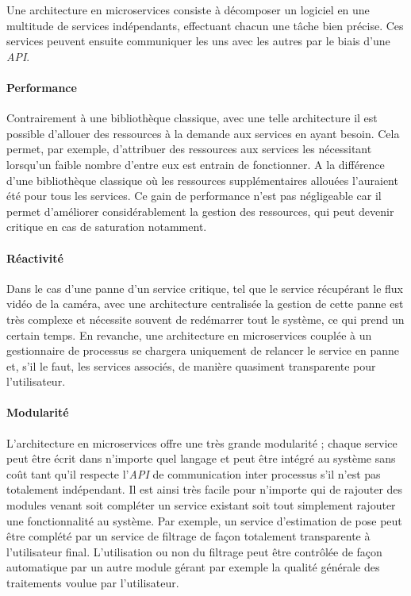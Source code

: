 Une architecture en microservices consiste à décomposer un logiciel en une multitude de services indépendants, effectuant chacun une tâche bien précise. Ces services peuvent ensuite communiquer les uns avec les autres par le biais d'une \emph{API}.

\paragraph{Performance} Contrairement à une bibliothèque classique, avec une telle architecture il est possible d'allouer des ressources à la demande aux services en ayant besoin. Cela permet, par exemple, d'attribuer des ressources aux services les nécessitant lorsqu'un faible nombre d'entre eux est entrain de fonctionner. A la différence d'une bibliothèque classique où les ressources supplémentaires allouées l'auraient été pour tous les services. Ce gain de performance n'est pas négligeable car il permet d'améliorer considérablement la gestion des ressources, qui peut devenir critique en cas de saturation notamment.

\paragraph{Réactivité} Dans le cas d'une panne d'un service critique, tel que le service récupérant le flux vidéo de la caméra, avec une architecture centralisée la gestion de cette panne est très complexe et nécessite souvent de redémarrer tout le système, ce qui prend un certain temps. En revanche, une architecture en microservices couplée à un gestionnaire de processus se chargera uniquement de relancer le service en panne et, s'il le faut, les services associés, de manière quasiment transparente pour l'utilisateur.

\paragraph{Modularité} L'architecture en microservices offre une très grande modularité ; chaque service peut être écrit dans n'importe quel langage et peut être intégré au système sans coût tant qu'il respecte l'\emph{API} de communication inter processus s'il n'est pas totalement indépendant. Il est ainsi très facile pour n'importe qui de rajouter des modules venant soit compléter un service existant soit tout simplement rajouter une fonctionnalité au système. Par exemple, un service d'estimation de pose peut être complété par un service de filtrage de façon totalement transparente à l'utilisateur final. L'utilisation ou non du filtrage peut être contrôlée de façon automatique par un autre module gérant par exemple la qualité générale des traitements voulue par l'utilisateur.

